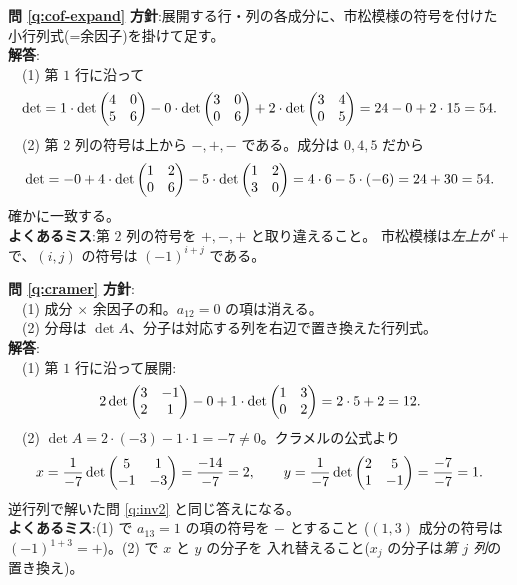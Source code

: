 \bigskip
\noindent\textbf{問 \ref{q:cof-expand}}\quad
\textbf{方針}:展開する行・列の各成分に、市松模様の符号を付けた
小行列式(=余因子)を掛けて足す。\\
\textbf{解答}:\\
　(1) 第 $1$ 行に沿って
\[
\det = 1 \cdot \det \begin{pmatrix}4 & 0 \\ 5 & 6\end{pmatrix}
- 0 \cdot \det \begin{pmatrix}3 & 0 \\ 0 & 6\end{pmatrix}
+ 2 \cdot \det \begin{pmatrix}3 & 4 \\ 0 & 5\end{pmatrix}
= 24 - 0 + 2 \cdot 15 = 54.
\]
　(2) 第 $2$ 列の符号は上から $-, +, -$ である。成分は $0, 4, 5$ だから
\[
\det = -0 + 4 \cdot \det \begin{pmatrix}1 & 2 \\ 0 & 6\end{pmatrix}
- 5 \cdot \det \begin{pmatrix}1 & 2 \\ 3 & 0\end{pmatrix}
= 4 \cdot 6 - 5 \cdot (-6) = 24 + 30 = 54.
\]
確かに一致する。\\
\textbf{よくあるミス}:第 $2$ 列の符号を $+, -, +$ と取り違えること。
市松模様は\emph{左上が $+$}で、$(i, j)$ の符号は $(-1)^{i+j}$ である。

\bigskip
\noindent\textbf{問 \ref{q:cramer}}\quad
\textbf{方針}:\\
　(1) 成分 $\times$ 余因子の和。$a_{12} = 0$ の項は消える。\\
　(2) 分母は $\det A$、分子は対応する列を右辺で置き換えた行列式。\\
\textbf{解答}:\\
　(1) 第 $1$ 行に沿って展開:
\[
2 \det \begin{pmatrix}3 & -1 \\ 2 & 1\end{pmatrix} - 0 + 1 \cdot \det \begin{pmatrix}1 & 3 \\ 0 & 2\end{pmatrix}
= 2 \cdot 5 + 2 = 12.
\]
　(2) $\det A = 2 \cdot (-3) - 1 \cdot 1 = -7 \neq 0$。クラメルの公式より
\[
x = \frac{1}{-7}\det \begin{pmatrix}5 & 1 \\ -1 & -3\end{pmatrix} = \frac{-14}{-7} = 2,
\qquad
y = \frac{1}{-7}\det \begin{pmatrix}2 & 5 \\ 1 & -1\end{pmatrix} = \frac{-7}{-7} = 1.
\]
逆行列で解いた問 \ref{q:inv2} と同じ答えになる。\\
\textbf{よくあるミス}:(1) で $a_{13} = 1$ の項の符号を $-$ とすること
($(1,3)$ 成分の符号は $(-1)^{1+3} = +$)。(2) で $x$ と $y$ の分子を
入れ替えること($x_j$ の分子は\emph{第 $j$ 列}の置き換え)。

